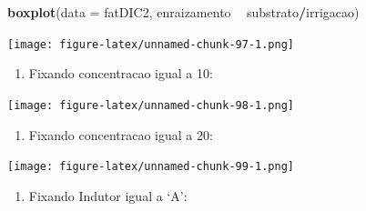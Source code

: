 \documentclass[
]{article}
\newenvironment{Shaded}{\begin{snugshade}}{\end{snugshade}}
\newcommand{\DataTypeTok}[1]{\textcolor[rgb]{0.13,0.29,0.53}{#1}}
\newcommand{\DecValTok}[1]{\textcolor[rgb]{0.00,0.00,0.81}{#1}}
\newcommand{\KeywordTok}[1]{\textcolor[rgb]{0.13,0.29,0.53}{\textbf{#1}}}
\newcommand{\NormalTok}[1]{#1}
\newcommand{\OperatorTok}[1]{\textcolor[rgb]{0.81,0.36,0.00}{\textbf{#1}}}
\newcommand{\StringTok}[1]{\textcolor[rgb]{0.31,0.60,0.02}{#1}}
\providecommand{\tightlist}{%
  \setlength{\itemsep}{0pt}\setlength{\parskip}{0pt}}
\begin{document}
\begin{Shaded}
\begin{Highlighting}[]
\KeywordTok{boxplot}\NormalTok{(}\DataTypeTok{data =}\NormalTok{ fatDIC2, enraizamento }\OperatorTok{~}\StringTok{ }\NormalTok{substrato}\OperatorTok{/}\NormalTok{irrigacao)}
\end{Highlighting}
\end{Shaded}

\texttt{[image: figure-latex/unnamed-chunk-97-1.png]}

\begin{enumerate}
\def\labelenumi{\arabic{enumi}.}
\setcounter{enumi}{3}
\tightlist
\item
  Fixando concentracao igual a 10:
\end{enumerate}

\begin{Shaded}
\end{Shaded}

\texttt{[image: figure-latex/unnamed-chunk-98-1.png]}

\begin{enumerate}
\def\labelenumi{\arabic{enumi}.}
\setcounter{enumi}{4}
\tightlist
\item
  Fixando concentracao igual a 20:
\end{enumerate}

\begin{Shaded}
\end{Shaded}

\texttt{[image: figure-latex/unnamed-chunk-99-1.png]}

\begin{enumerate}
\def\labelenumi{\arabic{enumi}.}
\setcounter{enumi}{5}
\tightlist
\item
  Fixando Indutor igual a `A':
\end{enumerate}
\end{document}
